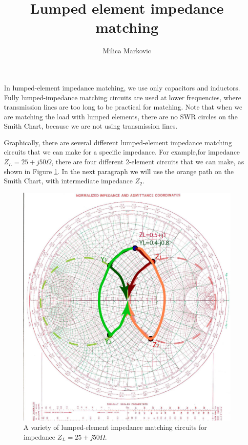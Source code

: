 \documentclass{ximera}
\title{Lumped element impedance matching}
\author{Milica Markovic}
\begin{document}
  
\begin{abstract}  

\end{abstract}  
\maketitle    


In lumped-element impedance matching, we use only capacitors and inductors. Fully lumped-impedance matching circuits are used at lower frequencies, where transmission lines are too long to be practical for matching. Note that when we are matching the load with lumped elements, there are no SWR circles on the Smith Chart, because we are not using transmission lines.

Graphically, there are several different lumped-element impedance matching circuits that we can make for a specific impedance. For example,for impedance $Z_L=25+j50 \Omega$, there are four different 2-element circuits that we can make, as shown in Figure \ref{fig:LumpedVariety}. In the next paragraph we will use the orange path on the Smith Chart, with intermediate impedance $Z_2$.



\begin{figure}[htbp]
\begin{center}
\includegraphics[scale=1]{../jpg/LumpedVariety-01.jpg}
\end{center}
\caption{A variety of lumped-element impedance matching circuits for impedance $Z_L=25+j50 \Omega$.}
\label{fig:LumpedVariety}
\end{figure}
\end{document}
